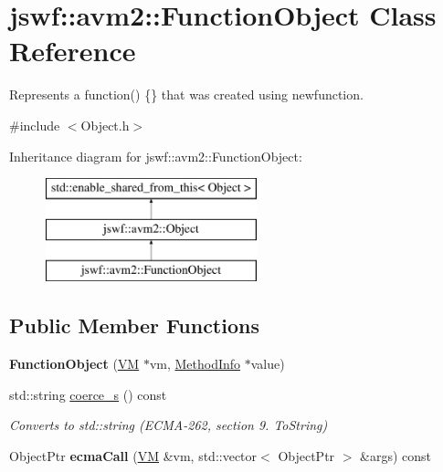 \hypertarget{classjswf_1_1avm2_1_1_function_object}{\section{jswf\+:\+:avm2\+:\+:Function\+Object Class Reference}
\label{classjswf_1_1avm2_1_1_function_object}
}


Represents a {\ttfamily function() \{\}} that was created using {\ttfamily newfunction}.  




{\ttfamily \#include $<$Object.\+h$>$}

Inheritance diagram for jswf\+:\+:avm2\+:\+:Function\+Object\+:\begin{figure}[H]
\begin{center}
\leavevmode
\includegraphics[height=3.000000cm]{classjswf_1_1avm2_1_1_function_object}
\end{center}
\end{figure}
\subsection*{Public Member Functions}
\begin{DoxyCompactItemize}
\item 
\hypertarget{classjswf_1_1avm2_1_1_function_object_a7e1b1e1fe5f501de5637d570fc16ff85}{{\bfseries Function\+Object} (\hyperlink{classjswf_1_1avm2_1_1_v_m}{V\+M} $\ast$vm, \hyperlink{structjswf_1_1avm2_1_1_method_info}{Method\+Info} $\ast$value)}\label{classjswf_1_1avm2_1_1_function_object_a7e1b1e1fe5f501de5637d570fc16ff85}

\item 
std\+::string \hyperlink{classjswf_1_1avm2_1_1_function_object_ac55cd266dc4433d40bb2fcae8bf06d6e}{coerce\+\_\+s} () const 
\begin{DoxyCompactList}\small\item\em Converts to {\ttfamily std\+::string} (E\+C\+M\+A-\/262, section 9. {\itshape To\+String}) \end{DoxyCompactList}\item 
\hypertarget{classjswf_1_1avm2_1_1_function_object_a4728e9735e1143835de32e56808fd0c0}{Object\+Ptr {\bfseries ecma\+Call} (\hyperlink{classjswf_1_1avm2_1_1_v_m}{V\+M} \&vm, std\+::vector$<$ Object\+Ptr $>$ \&args) const }\label{classjswf_1_1avm2_1_1_function_object_a4728e9735e1143835de32e56808fd0c0}

\end{DoxyCompactItemize}
